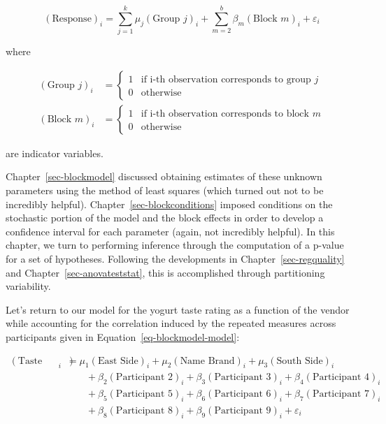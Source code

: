 \documentclass[
  letterpaper,
  DIV=11,
  numbers=noendperiod]{scrreprt}
\theoremstyle{definition}
\theoremstyle{definition}
\theoremstyle{plain}
\theoremstyle{remark}
\begin{document}
\[(\text{Response})_i = \sum_{j=1}^{k} \mu_j (\text{Group } j)_i + \sum_{m=2}^{b} \beta_m (\text{Block } m)_i + \varepsilon_i\]

where

\[
\begin{aligned}
  (\text{Group } j)_i 
    &= \begin{cases} 1 & \text{if i-th observation corresponds to group } j \\ 0 & \text{otherwise} \end{cases} \\
  (\text{Block } m)_i
    &= \begin{cases} 1 & \text{if i-th observation corresponds to block } m \\ 0 & \text{otherwise} \end{cases}
\end{aligned}
\]

are indicator variables.

Chapter~\ref{sec-blockmodel} discussed obtaining estimates of these
unknown parameters using the method of least squares (which turned out
not to be incredibly helpful). Chapter~\ref{sec-blockconditions} imposed
conditions on the stochastic portion of the model and the block effects
in order to develop a confidence interval for each parameter (again, not
incredibly helpful). In this chapter, we turn to performing inference
through the computation of a p-value for a set of hypotheses. Following
the developments in Chapter~\ref{sec-regquality} and
Chapter~\ref{sec-anovateststat}, this is accomplished through
partitioning variability.

Let's return to our model for the yogurt taste rating as a function of
the vendor while accounting for the correlation induced by the repeated
measures across participants given in
Equation~\ref{eq-blockmodel-model}:

\[
\begin{aligned}
  (\text{Taste Rating})_i &= \mu_1 (\text{East Side})_i + \mu_2 (\text{Name Brand})_i + \mu_3 (\text{South Side})_i \\
    &\qquad + \beta_2 (\text{Participant 2})_i + \beta_3 (\text{Participant 3})_i + \beta_4 (\text{Participant 4})_i \\
    &\qquad + \beta_5 (\text{Participant 5})_i + \beta_6 (\text{Participant 6})_i + \beta_7 (\text{Participant 7})_i \\
    &\qquad + \beta_8 (\text{Participant 8})_i + \beta_9 (\text{Participant 9})_i + \varepsilon_i
\end{aligned}
\]
\end{document}
